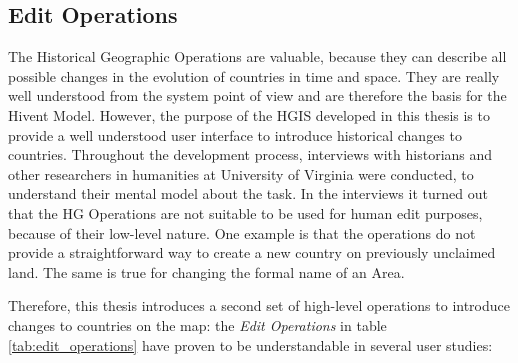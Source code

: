 

\subsection{Edit Operations} %
\label{sub:edit_operations}

The Historical Geographic Operations are valuable, because they can describe all possible changes in the evolution of countries in time and space. They are really well understood from the system point of view and are therefore the basis for the Hivent Model. However, the purpose of the HGIS developed in this thesis is to provide a well understood user interface to introduce historical changes to countries. Throughout the development process, interviews with historians and other researchers in humanities at University of Virginia were conducted, to understand their mental model about the task. In the interviews it turned out that the HG Operations are not suitable to be used for human edit purposes, because of their low-level nature. One example is that the operations do not provide a straightforward way to create a new country on previously unclaimed land. The same is true for changing the formal name of an Area.

Therefore, this thesis introduces a second set of high-level operations to introduce changes to countries on the map: the \emph{Edit Operations} in table \ref{tab:edit_operations} have proven to be understandable in several user studies:


